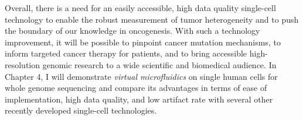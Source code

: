 Overall, there is a need for an easily accessible, high data quality single-cell technology to enable the robust measurement of tumor heterogeneity and to push the boundary of our knowledge in oncogenesis. With such a technology improvement, it will be possible to pinpoint cancer mutation mechanisms, to inform targeted cancer therapy for patients, and to bring accessible high-resolution genomic research to a wide scientific and biomedical audience. In Chapter 4, I will demonstrate \textit{virtual microfluidics} on single human cells for whole genome sequencing and compare its advantages in terms of ease of implementation, high data quality, and low artifact rate with several other recently developed single-cell technologies. 

